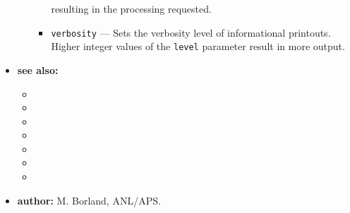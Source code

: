 \begin{itemize}
\begin{itemize}
\begin{itemize}
                resulting in the processing requested.
        \item \verb|verbosity| --- Sets the verbosity level of informational printouts. Higher integer values
                of the \verb|level| parameter result in more output.
        \end{itemize}
    \end{itemize}
\item {\bf see also:}
    \begin{itemize}
    \item {}
    \item {}
    \item {}
    \item {}
    \item {}
    \item {}
    \item {}
    \end{itemize}
\item {\bf author:} M. Borland, ANL/APS.
\end{itemize}

